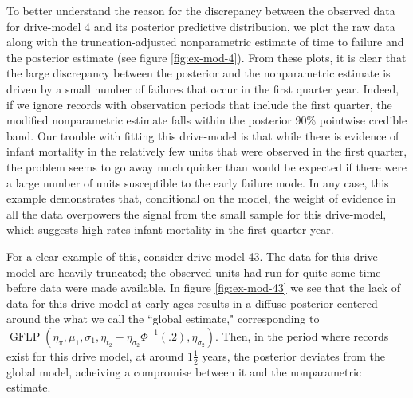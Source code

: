 \documentclass[12pt]{article}
\newcommand{\op}{\operatorname}
\begin{document}
To better understand the reason for the discrepancy between the observed data for drive-model 4 and its posterior predictive distribution, we plot the raw data along with the truncation-adjusted nonparametric estimate of time to failure and the posterior estimate (see figure \ref{fig:ex-mod-4}). From these plots, it is clear that the large discrepancy between the posterior and the nonparametric estimate is driven by a small number of failures that occur in the first quarter year. Indeed, if we ignore records with observation periods that include the first quarter, the modified nonparametric estimate falls within the posterior 90\% pointwise credible band. Our trouble with fitting this drive-model is that while there is evidence of infant mortality in the relatively few units that were observed in the first quarter, the problem seems to go away much quicker than would be expected if there were a large number of units susceptible to the early failure mode. In any case, this example demonstrates that, conditional on the model, the weight of evidence in all the data overpowers the signal from the small sample for this drive-model, which suggests high rates infant mortality in the first quarter year.

For a clear example of this, consider drive-model 43. The data for this drive-model are heavily truncated; the observed units had run for quite some time before data were made available. In figure \ref{fig:ex-mod-43} we see that the lack of data for this drive-model at early ages results in a diffuse posterior centered around the what we call the ``global estimate," corresponding to $\op{GFLP}(\eta_{\pi}, \mu_1,\sigma_1, \eta_{t_2} - \eta_{\sigma_2}\Phi^{-1}(.2), \eta_{\sigma_2})$. Then, in the period where records exist for this drive model, at around $1\frac{1}{2}$ years, the posterior deviates from the global model, acheiving a compromise between it and the nonparametric estimate.
\end{document}
